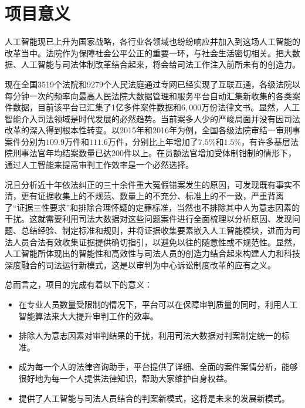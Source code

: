 \section{项目意义}
人工智能现已上升为国家战略，各行业各领域也纷纷响应并加入到这场人工智能的改革当中。法院作为保障社会公平公正的重要一环，与社会生活密切相关。把大数据、人工智能与司法体制改革结合起来，将会给司法工作注入前所未有的创造力。

现在全国3519个法院和9279个人民法庭通过专网已经实现了互联互通，各级法院以每分钟一次的频率向最高人民法院大数据管理和服务平台自动汇集新收集的各类案件数据，目前该平台已汇集了1亿多件案件数据和$6,000$万份法律文书。显然，人工智能介入司法领域是时代发展的必然趋势。当前案多人少的严峻局面并没有因司法改革的深入得到根本性转变。以2015年和2016年为例，全国各级法院审结一审刑事案件分别为$109.9$万件和$111.6$万件，分别比上年增加了$7.5\%$和$1.5\%$，有许多基层法院刑事法官年均结案数量已达200件以上。在员额法官增加受体制钳制的情形下，通过人工智能来提高审判工作效率是一个必然选择。

况且分析近十年依法纠正的三十余件重大冤假错案发生的原因，可发现既有事实不清，更有证据收集上的不规范、数量上的不充分、标准上的不一致，严重背离了“证据三性要求”和排除合理怀疑的定罪标准，当然也不排除其中人为意志因素的干扰。这就需要利用司法大数据对这些问题案件进行全面梳理以分析原因、发现问题、总结经验、制定标准和规则，并将证据收集要素嵌入人工智能模块，进而为司法人员合法有效收集证据提供确切指引，以避免以往的随意性或不规范性。显然，人工智能所体现出的智能性和高效性与司法人员的创造力结合起来构建人力和科技深度融合的司法运行新模式，这是以审判为中心诉讼制度改革的应有之义。

总而言之，项目的完成有着以下的意义：
\begin{itemize}
	\item 在专业人员数量受限制的情况下，平台可以在保障审判质量的同时，利用人工智能算法来大大提升审判工作的效率。
	\item 排除人为意志因素对审判结果的干扰，利用司法大数据对判案制定统一的标准。
	\item 成为每一个人的法律咨询助手，平台提供了详细、全面的案件案情分析，能够很好地为每一个人提供法律知识，帮助大家维护自身权益。
	\item 提供了人工智能与司法人员结合的判案新模式，这将是未来的发展新模式。
\end{itemize}




